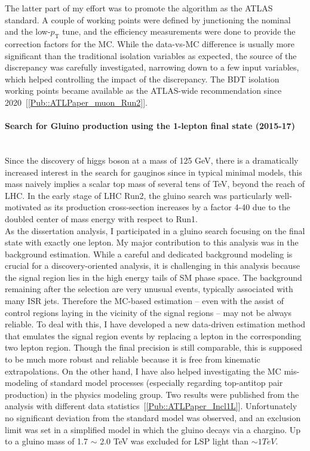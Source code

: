 \documentclass[12pt]{article}
\newcommand{\Subsubsection}[1]{\subsubsection*{#1}
\addcontentsline{toc}{subsubsection}{#1}}
\newcommand{\pt}{\ensuremath{p_{\text{T}}}\xspace}
\begin{document}
The latter part of my effort was to promote the algorithm as the ATLAS standard.
A couple of working points were defined by junctioning the nominal and the low-\pt tune, and the efficiency measurements were done to provide the correction factors for the MC.
While the data-vs-MC difference is usually more significant than the traditional isolation variables as expected, the source of the discrepancy was carefully investigated, narrowing down to a few input variables, which helped controlling the impact of the discrepancy.
The BDT isolation working points became available as the ATLAS-wide recommendation since 2020~[\ref{Pub::ATLPaper_muon_Run2}].


\paragraph{Search for Gluino production using the 1-lepton final state (2015-17)}  \phantom{k} \vspace{3mm} \\
Since the discovery of higgs boson at a mass of 125 GeV, there is a dramatically increased interest in the search for gauginos since in typical minimal models, this mass naively implies a scalar top mass of several tens of TeV, beyond the reach of LHC. In the early stage of LHC Run2, the gluino search was particularly well-motivated as its production cross-section increases by a factor 4-40 due to the doubled center of mass energy with respect to Run1. \\

As the dissertation analysis, I participated in a gluino search focusing on the final state with exactly one lepton. 
My major contribution to this analysis was in the background estimation. 
While a careful and dedicated background modeling is crucial for a discovery-oriented analysis, 
it is challenging in this analysis because the signal region lies in the high energy tails of SM phase space. 
The background remaining after the selection are very unusual events, 
typically associated with many ISR jets. 
Therefore the MC-based estimation -- even with the assist of control regions laying in the vicinity of the signal regions -- may not be always reliable.
To deal with this, I have developed a new data-driven estimation method that emulates the signal region events by replacing a lepton in the corresponding two lepton region.
Though the final precision is still comparable, this is supposed to be much more robust and reliable because it is free from kinematic extrapolations.
On the other hand, I have also helped investigating the MC mis-modeling of standard model processes (especially regarding top-antitop pair production) in the physics modeling group.
Two results were published from the analysis with different data statistics~[\ref{Pub::ATLPaper_Incl1L}]. 
Unfortunately no significant deviation from the standard model was observed, and an exclusion limit was set in a simplified model in which the gluino decays via a chargino.
Up to a gluino mass of 1.7 $\sim$ 2.0 TeV was excluded for LSP light than $\sim1TeV$. \\ \\
\end{document}
